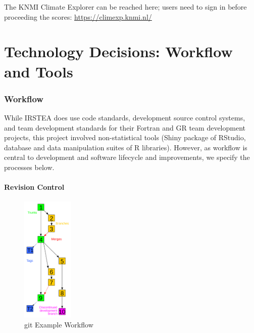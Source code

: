 \documentclass[logos,parttoc,morelanguage=french,morelanguage=german]{orsay-memoire}
\begin{document}
The KNMI Climate Explorer can be reached here; users need to sign in before proceeding the scores: \href{https://climexp.knmi.nl/}{https://climexp.knmi.nl/}

\clearpage

\part{Technology Decisions: Workflow and Tools}

\section{Workflow}

While IRSTEA does use code standards, development source control systems, and team development standards for their Fortran and GR team development projects, this project involved non-statistical tools (Shiny package of RStudio, database and data manipulation suites of R libraries). However, as workflow is central to development and software lifecycle and improvements, we specify the processes below.

\subsection{Revision Control}

\begin{figure}
\centering
\includegraphics[width=0.22\textwidth]{images/440px-Revision_controlled_project_visualization-2010-24-02_svg.png}
  \caption{git Example Workflow}
  \label{fig:gitbranches}
\end{figure}
\end{document}
